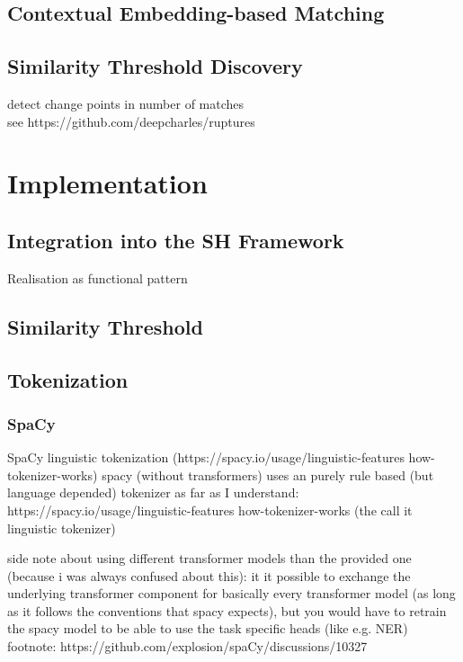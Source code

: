 \documentclass[11pt]{scrreprt}
\begin{document}
\section{Contextual Embedding-based Matching}


\section{Similarity Threshold Discovery}
detect change points in number of matches \\ 
see https://github.com/deepcharles/ruptures


\chapter{Implementation}

\section{Integration into the SH Framework}
Realisation as functional pattern

\section{Similarity Threshold}
\label{sec:similarity-threshold}


\section{Tokenization}

\subsection{SpaCy}
SpaCy linguistic tokenization (https://spacy.io/usage/linguistic-features how-tokenizer-works)
spacy (without transformers) uses an purely rule based (but language depended) tokenizer as far as I understand: https://spacy.io/usage/linguistic-features how-tokenizer-works (the call it linguistic tokenizer)

side note about using different transformer models than the provided one (because i was always confused about this):
it it possible to exchange the underlying transformer component for basically every transformer model (as long as it follows the conventions that spacy expects), but you would have to retrain the spacy model to be able to use the task specific heads (like e.g. NER)
footnote: https://github.com/explosion/spaCy/discussions/10327
\end{document}
